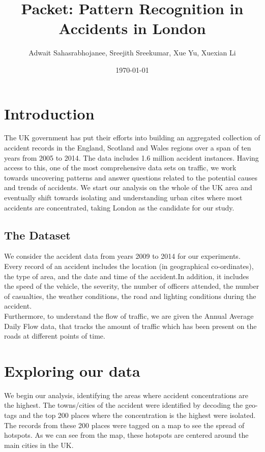 \documentclass{neu_handout}
\title{Packet: Pattern Recognition in Accidents in London}
\author{Adwait Sahasrabhojanee, Sreejith Sreekumar, Xue Yu, Xuexian Li}
\date{\today}
\begin{document}
\section{Introduction}
The UK government has put their efforts into building an aggregated collection of accident records in the England, Scotland and Wales regions
over a span of ten years from 2005 to 2014. The data includes 1.6 million accident instances. Having access to this, one of the most comprehensive data sets on traffic, we work towards
uncovering patterns and answer questions related to the potential causes and trends of accidents. We start our analysis on the whole of the UK area and eventually shift towards
isolating and understanding urban cites where most accidents are concentrated, taking London
as the candidate for our study.

\subsection{The Dataset}
We consider the accident data from years 2009 to 2014 for our experiments. Every record of an accident includes the location (in geographical co-ordinates), the type of area, and the date and time of the accident.In addition, it includes the speed of the vehicle, the severity, the number of officers attended, the number of casualties, the weather conditions, the road and lighting conditions during the accident. \\

Furthermore, to understand the flow of traffic, we are given the Annual Average Daily Flow data, that tracks the amount of traffic which has been present on the roads at different points of time. \\

\section{Exploring our data}
We begin our analysis, identifying the areas where accident concentrations are the highest. The towns/cities of the accident were identified by decoding the geo-tags and the top 200 places where the concentration is the highest were isolated. The records from these 200 places were tagged on a map to see the spread of hotspots. As we can see from the map, these hotspots are centered around the main cities in the UK.
\end{document}
